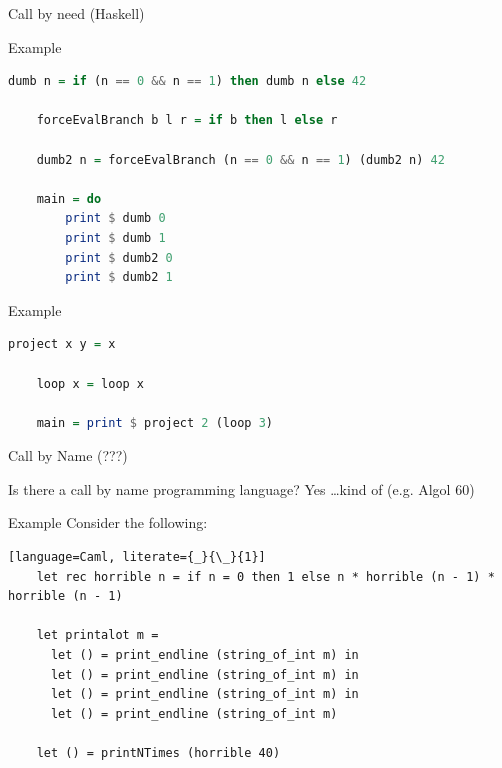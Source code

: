 \documentclass[10pt]{beamer}
\begin{document}
\begin{frame}[fragile]{Call by need (Haskell)}
  \begin{alertblock}{Example}
  \begin{lstlisting}[language=Haskell]
    dumb n = if (n == 0 && n == 1) then dumb n else 42

    forceEvalBranch b l r = if b then l else r

    dumb2 n = forceEvalBranch (n == 0 && n == 1) (dumb2 n) 42

    main = do
        print $ dumb 0
        print $ dumb 1
        print $ dumb2 0
        print $ dumb2 1

  \end{lstlisting}
  \end{alertblock}

  \pause

  \begin{alertblock}{Example}
  \begin{lstlisting}[language=Haskell]
    project x y = x

    loop x = loop x

    main = print $ project 2 (loop 3)
  \end{lstlisting}
  \end{alertblock}


\end{frame}

\begin{frame}[fragile]{Call by Name (???)}
  \begin{alertblock}{Is there a call by name programming language?}
    Yes \dots kind of (e.g. Algol 60)
  \end{alertblock}

  \begin{alertblock}{Example}
    Consider the following:
  \begin{lstlisting}[language=Caml, literate={_}{\_}{1}]
    let rec horrible n = if n = 0 then 1 else n * horrible (n - 1) * horrible (n - 1)

    let printalot m =
      let () = print_endline (string_of_int m) in
      let () = print_endline (string_of_int m) in
      let () = print_endline (string_of_int m) in
      let () = print_endline (string_of_int m)

    let () = printNTimes (horrible 40)

  \end{lstlisting}
  \end{alertblock}
\end{frame}
\end{document}
